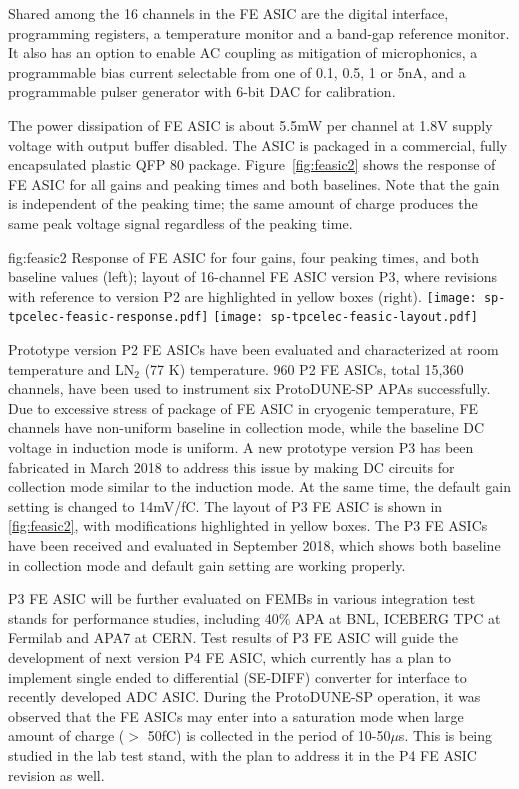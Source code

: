 Shared among the 16 channels in the FE ASIC are the digital interface, programming registers, a temperature monitor and a band-gap reference monitor. It also has an option to enable AC coupling as mitigation of microphonics, a programmable bias current selectable from one of 0.1, 0.5, 1 or 5nA, and a programmable pulser generator with 6-bit DAC for calibration. 

The power dissipation of FE ASIC is about 5.5mW per channel at 1.8V supply voltage with output buffer disabled. The ASIC is packaged in a commercial, fully encapsulated plastic QFP 80 package. Figure~\ref{fig:feasic2} shows the response of FE ASIC for all gains and peaking times and both baselines. Note that the gain is independent of the peaking time; the same amount of charge produces the same peak voltage signal regardless of the peaking time.

\begin{dunefigure}
{fig:feasic2}
{Response of FE ASIC for four gains, four peaking times, and both baseline values (left); layout of 16-channel FE ASIC version P3, where revisions with reference to version P2 are highlighted in yellow boxes (right).}
\texttt{[image: sp-tpcelec-feasic-response.pdf]}
\texttt{[image: sp-tpcelec-feasic-layout.pdf]}
\end{dunefigure}

Prototype version P2 FE ASICs have been evaluated and characterized at room temperature and LN$_2$ (77 K) temperature. 960 P2 FE ASICs, total 15,360 channels, have been used to instrument six ProtoDUNE-SP APAs successfully. Due to excessive stress of package of FE ASIC in cryogenic temperature, FE channels have non-uniform baseline in collection mode, while the baseline DC voltage in induction mode is uniform. A new prototype version P3 has been fabricated in March 2018 to address this issue by making DC circuits for collection mode similar to the induction mode. At the same time, the default gain setting is changed to 14mV/fC. The layout of P3 FE ASIC is shown in \ref{fig:feasic2}, with modifications highlighted in yellow boxes. The P3 FE ASICs have been received and evaluated in September 2018, which shows both baseline in collection mode and default gain setting are working properly.

P3 FE ASIC will be further evaluated on FEMBs in various integration test stands for performance studies, including 40\% APA at BNL, ICEBERG TPC at Fermilab and APA7 at CERN. Test results of P3 FE ASIC will guide the development of next version P4 FE ASIC, which currently has a plan to implement single ended to differential (SE-DIFF) converter for interface to recently developed ADC ASIC. During the ProtoDUNE-SP operation, it was observed that the FE ASICs may enter into a saturation mode when large amount of charge ($>$ 50fC) is collected in the period of 10-50$\mu$s. This is being studied in the lab test stand, with the plan to address it in the P4 FE ASIC revision as well.

